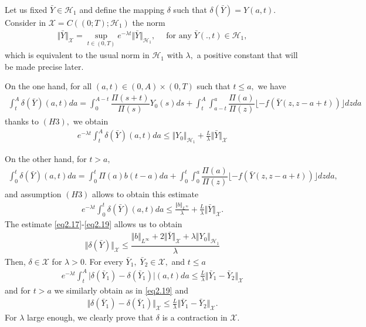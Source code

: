 \documentclass[10pt, a4paper]{amsart}
\makeatletter
\newcounter{assu}
\theoremstyle{plain}
\theoremstyle{definition}
\theoremstyle{remark}
\renewenvironment{proof}[1][\proofname]{\par
  \pushQED{\qed}%
  \normalfont \topsep6\p@\@plus6\p@\relax
  \trivlist
  \item[\hskip\labelsep
        \itshape
    #1\ \ref{#1}.]\ignorespaces
}{%
  \popQED\endtrivlist\@endpefalse
}
\numberwithin{equation}{section}
\makeatother
\begin{document}
\begin{proof}[of Theorem \ref{th2.6}]
Let us fixed $\bar{Y}\in \mathcal{H}_1$ and define the mapping $\delta$ such that $\delta(\bar{Y})=Y(a,t).$ Consider in $\mathcal{X}=C((0;T); \mathcal{H}_1)$ the norm 
\begin{align*}
\Vert \bar{Y}\Vert_{\mathcal{X}}=\sup_{t\in(0,T)}e^{-\lambda t}\Vert \bar{Y}\Vert_{\mathcal{H}_1},\quad\;\text{for any}\;\bar{Y}(.,t)\in \mathcal{H}_1,
\end{align*}
which is equivalent to the usual norm in $\mathcal{H}_1$ with $\lambda,$ a positive constant that will
be made precise later. 

 On the one hand, for all $(a, t)\in(0,A)\times(0,T)$ such that $t\leq a,$ we have 
\begin{align}
    \displaystyle\int_t^A\delta(\bar{Y})(a,t)da=\displaystyle\int_0^{A-t}\dfrac{\Pi(s+t)}{\Pi(s)}Y_{0}(s)ds+\displaystyle\int_t^A\displaystyle\int_{a-t}^{a}\dfrac{\Pi(a)}{\Pi(z)}\lfloor -f(\bar{Y}(z,z-a+t))\rfloor dzda
\end{align}
thanks to $(H3),$ we obtain 
\begin{align}\label{eq2.17}
    e^{-\lambda t}\displaystyle\int_t^A\delta(\bar{Y})(a,t)da\leq\Vert Y_0\Vert_{\mathcal{H}_1}+\frac{L}{\lambda}\Vert\bar{Y}\Vert_{\mathcal{X}}
\end{align}

 On the other hand,  for $t>a,$
 \begin{align}
    \displaystyle\int_0^t\delta(\bar{Y})(a,t)da=\displaystyle\int_0^{t}\Pi(a)b(t-a)da+\displaystyle\int_0^t\displaystyle\int_{0}^{a}\dfrac{\Pi(a)}{\Pi(z)}\lfloor -f(\bar{Y}(z,z-a+t))\rfloor dzda,
\end{align}
and assumption $(H3)$ allows to obtain this estimate
\begin{align}\label{eq2.19}
    e^{-\lambda t}\displaystyle\int_0^t\delta(\bar{Y})(a,t)da\leq \frac{\Vert b\Vert_{L^{\infty}}}{\lambda}+\frac{L}{\lambda}\Vert\bar{Y}\Vert_{\mathcal{X}}.
\end{align}
The estimate \eqref{eq2.17}-\eqref{eq2.19} allows us to obtain
\begin{align}
\Vert\delta(\bar{Y})\Vert_{\mathcal{X}}\leq\dfrac{\Vert b\Vert_{L^{\infty}}+2\Vert\bar{Y}\Vert_{\mathcal{X}} +\lambda\Vert Y_0\Vert_{\mathcal{H}_1}}{\lambda}
\end{align}
Then, $\delta\in \mathcal{X}$ for $\lambda>0.$  For every $\bar{Y}_1,\; \bar{Y}_2\in \mathcal{X},$ and $t\leq a$
\begin{align}
e^{-\lambda t}\displaystyle\int_t^A\vert\delta(\bar{Y}_1)-\delta(\bar{Y}_1)\vert(a,t)da\leq\frac{L}{\lambda}\Vert\bar{Y}_1-\bar{Y}_2\Vert_\mathcal{X}
\end{align}
and for $t>a$ we similarly obtain as in \eqref{eq2.19} and 
\begin{align}
    \Vert\delta(\bar{Y}_1)-\delta(\bar{Y}_1)\Vert_{\mathcal{X}}\leq\frac{L}{\lambda}\Vert\bar{Y}_1-\bar{Y}_2\Vert_\mathcal{X}.
\end{align}
For $\lambda$ large enough, we clearly prove that $\delta$ is a contraction in $\mathcal{X}.$
\end{proof}
\end{document}
